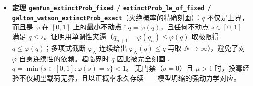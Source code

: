\begin{itemize}
  \begin{itemize}
  \tightlist
  \item
    定义 \texttt{genFun(s)\ =\ Σ\ p\_k\ s\^{}k}，证明其在 \([0,1]\)
    上单调、有界，\texttt{genFun(1)=1}；截断多项式 \texttt{genFun\_N}
    连续可导且
    \texttt{genFun\_N\textquotesingle{}(1)\ →\ m\ \textgreater{}\ 1}；
  \item
    \textbf{核心引理 \texttt{exists\_lt\_sub\_id}}：由
    \texttt{genFun\textquotesingle{}(1)\textgreater{}1}
    与连续性，取截断多项式 \texttt{genFun\_N} 使
    \texttt{genFun\_N\textquotesingle{}(s\$\_\{0\}\$)\textgreater{}1}，经
    MVT 与尾部估计推出存在 \(s₀<1\) 使
    \texttt{genFun(s\$\_\{0\}\$)\textless{}s\$\_\{0\}\$}；
  \item
    灭绝概率迭代 \(q_n = \varphi^n(0)\) 单调递增且被 \(s₀\)
    一致上界，故其极限 \(q = \sup q_n \le s₀ < 1\)。
  \end{itemize}
\item
  \textbf{定理 \texttt{genFun\_extinctProb\_fixed} /
  \texttt{extinctProb\_le\_of\_fixed} /
  \texttt{galton\_watson\_extinctProb\_exact}}（灭绝概率的精确刻画）：\(q\)
  不仅是上界，而且是 \(\varphi\) 在 \([0,1]\)
  上的\textbf{最小不动点}：\(q = \varphi(q)\)，且任何不动点
  \(s\in[0,1]\) 满足
  \(q \le s\)。证明用单调性夹逼（\(q_{n+1}=\varphi(q_n)\le\varphi(q)\)
  取极限得 \(q\le\varphi(q)\)；多项式截断 \(\varphi_N\) 连续给出
  \(\varphi_N(q)\le q\) 再取 \(N\to\infty\)），避免了对 \(\varphi\)
  自身连续性的依赖。超临界时 \(q\)
  因此被完全刻画：\(q = \min\{s\in[0,1] : \varphi(s)=s\} < 1\)。
  无门禁（\(\sigma=0\)）且 \(\mu>1\)
  时，投毒经验不仅期望载荷无界，且以正概率永久存续------模型坍缩的强动力学对应。
\end{itemize}

